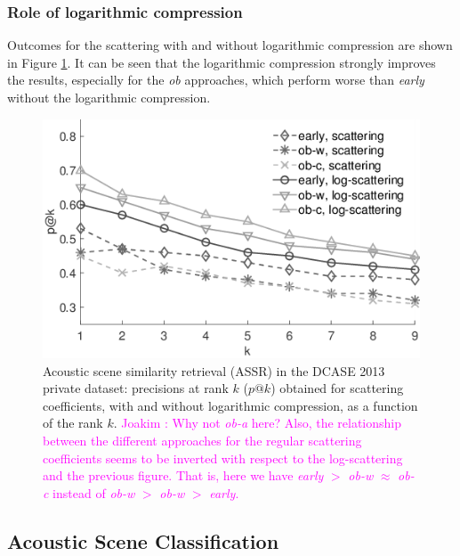 \documentclass[journal]{IEEEtran}
\newcommand{\ja}[1]{\textcolor{magenta}{Joakim : #1}}
\begin{document}
\subsubsection*{Role of logarithmic compression}

Outcomes for the scattering with and without logarithmic compression are shown in Figure \ref{fig:ASS_2}. It can be seen that the logarithmic compression strongly improves the results, especially for the \emph{ob} approaches, which perform worse than \emph{early} without the logarithmic compression.


\begin{figure}[t]
\begin{center}
\includegraphics[width=.9\columnwidth]{bw/unsupervised_test1}
\caption{Acoustic scene similarity retrieval (ASSR) in the DCASE 2013 private dataset: precisions at rank $k$ ($p@k$) obtained for scattering coefficients, with and without logarithmic compression, as a function of the rank $k$. \ja{Why not \emph{ob-a} here? Also, the relationship between the different approaches for the regular scattering coefficients seems to be inverted with respect to the log-scattering and the previous figure. That is, here we have \emph{early} $>$ \emph{ob-w} $\approx$ \emph{ob-c} instead of \emph{ob-w} $>$ \emph{ob-w} $>$ \emph{early}.}}
\label{fig:ASS_2}
\end{center}
\end{figure}

\subsection{Acoustic Scene Classification}
\end{document}

